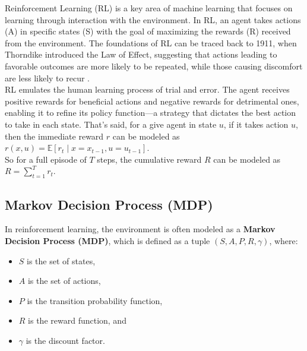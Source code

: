 
\renewcommand\theparagraph{\arabic{subsubsection}.\arabic{paragraph}}
\titleformat{\paragraph}[hang]{\normalfont\normalsize\bfseries}{\theparagraph}{1em}{}

Reinforcement Learning (RL) is a key area of machine learning that focuses on
learning through interaction with the environment. In RL, an agent takes
actions (A) in specific states (S) with the goal of maximizing the rewards (R)
received from the environment. The foundations of RL can be traced back to
1911, when Thorndike introduced the Law of Effect, suggesting that actions
leading to favorable outcomes are more likely to be repeated, while those
causing discomfort are less likely to recur \cite{bg1}.\\ RL emulates the human
learning process of trial and error. The agent receives positive rewards for
beneficial actions and negative rewards for detrimental ones, enabling it to
refine its policy function—a strategy that dictates the best action to take in
each state. That's said, for a give agent in state $u$, if it takes action $u$,
then the immediate reward $r$ can be modeled as $r(x, u) = \mathbb{E}[r_t \mid
    x=x_{t-1}, u=u_{t-1}]$.\\ So for a full episode of $T$ steps, the cumulative
reward $R$ can be modeled as $R = \sum_{t=1}^{T} r_t$.\\
\subsection{Markov Decision Process (MDP)}

In reinforcement learning, the environment is often modeled as a \textbf{Markov
    Decision Process (MDP)}, which is defined as a tuple $(S, A, P, R, \gamma)$,
where:
\begin{itemize}
    \item \( S \) is the set of states,
    \item \( A \) is the set of actions,
    \item \( P \) is the transition probability function,
    \item \( R \) is the reward function, and
    \item \( \gamma \) is the discount factor.
\end{itemize}

